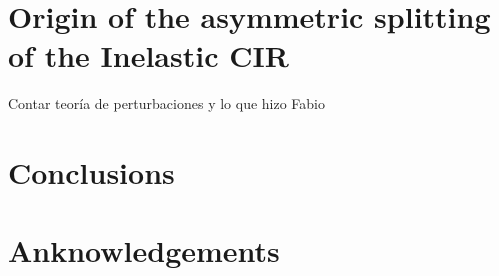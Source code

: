 \documentclass[aps,pre,twocolumn,superscriptaddress,showpacs]{revtex4-1}
\begin{document}
\section{Origin of the asymmetric splitting of the Inelastic CIR} \label{sec:perturbation}
Contar teoría de perturbaciones y lo que hizo Fabio

\section{Conclusions}
\section*{Anknowledgements}



\newpage
\end{document}
